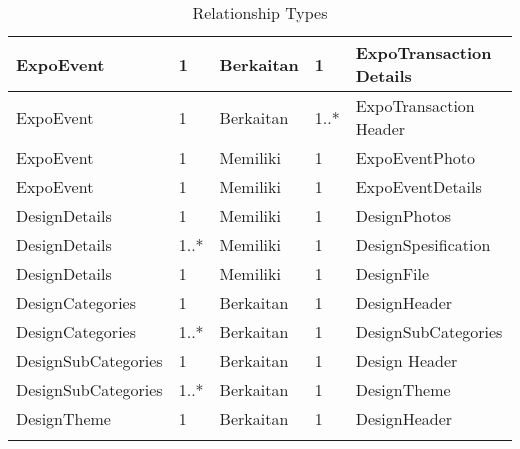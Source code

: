 \begin{longtable}{| p{3.4cm} | l | l | l | p{3.4cm} |}
		ExpoEvent & 1 & Berkaitan & 1 & ExpoTransaction Details \\ \hline
		ExpoEvent & 1 & Berkaitan & 1..* & ExpoTransaction Header \\ \hline
		ExpoEvent & 1 & Memiliki & 1 & ExpoEventPhoto \\ \hline
		ExpoEvent & 1 & Memiliki & 1 & ExpoEventDetails \\ \hline
		DesignDetails & 1 & Memiliki & 1 & DesignPhotos \\ \hline
		DesignDetails & 1..* & Memiliki & 1 & DesignSpesification \\ \hline
		DesignDetails & 1 & Memiliki & 1 & DesignFile \\ \hline
		DesignCategories & 1 & Berkaitan & 1 & DesignHeader \\ \hline
		DesignCategories & 1..* & Berkaitan & 1 & DesignSubCategories \\ \hline
		DesignSubCategories & 1 & Berkaitan & 1 & Design Header \\ \hline
		DesignSubCategories & 1..* & Berkaitan & 1 & DesignTheme \\ \hline
		DesignTheme & 1 & Berkaitan & 1 & DesignHeader \\ \hline
		\caption{Relationship Types}
	\end{longtable}
